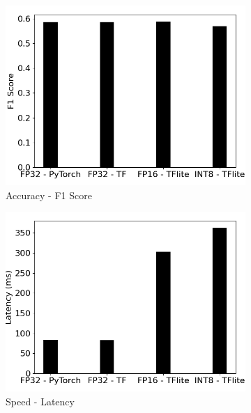 \begin{figure}[]
    \centering
    \begin{subfigure}{0.19\textwidth}
        \includegraphics[width=1\textwidth]{other/figures/YOLOv5s_COCO_Laptop/F1score.png}
        \caption{Accuracy - F1 Score}
    \end{subfigure}
    \begin{subfigure}{0.19\textwidth}
        \includegraphics[width=1\textwidth]{other/figures/YOLOv5s_COCO_Laptop/Latency.png}
        \caption{Speed - Latency}
    \end{subfigure}
    \begin{subfigure}{0.19\textwidth}

\end{subfigure}
\end{figure}
